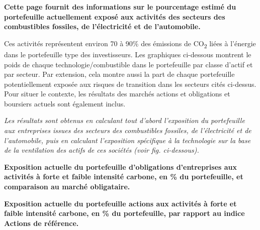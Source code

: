 \documentclass[10pt,table,a4]{article}\usepackage[]{graphicx}\usepackage[]{color}
\begin{document}
	\begin{multicols}{2}
		
		\textbf{Cette page fournit des informations sur le pourcentage estimé du portefeuille actuellement exposé aux activités des secteurs des combustibles fossiles, de l'électricité et de l'automobile.}
		
		
		Ces activités représentent environ 70 à 90\% des émissions de CO\textsubscript{2} liées à l'énergie dans le portefeuille type des investisseurs. Les graphiques ci-dessous montrent le poids de chaque technologie/combustible dans le portefeuille par classe d'actif et par secteur. Par extension, cela montre aussi la part de chaque portefeuille potentiellement exposée aux risques de transition dans les secteurs cités ci-dessus. Pour situer le contexte, les résultats des marchés actions et obligations et boursiers actuels sont également inclus.
		
		
		\textit{Les résultats sont obtenus en calculant tout d'abord l'exposition du portefeuille aux entreprises issues des secteurs des combustibles fossiles, de l'électricité et de l'automobile, puis en calculant l'exposition spécifique à la technologie sur la base de la ventilation des actifs de ces sociétés (voir fig. ci-dessous).}
		
		\vspace{-0.1cm}
		
	\end{multicols}
	
	\vspace{0.1cm}
	
	\textbf{Exposition actuelle du portefeuille d'obligations d’entreprises aux activités à forte et faible intensité carbone, en \% du portefeuille, et comparaison au marché obligataire.} 
	
	\vspace{-0.2cm}
	
	
	\textbf{Exposition actuelle du portefeuille actions aux activités à forte et faible intensité carbone, en \% du portefeuille, par rapport au indice Actions de référence.} 
	
	\vspace{-0.2cm}
	
	
\end{document}
